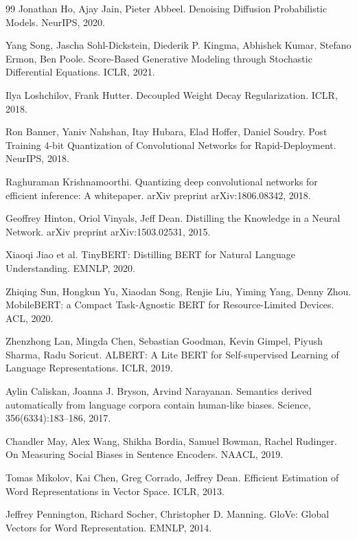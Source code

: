 \documentclass{article}
\begin{document}
\begin{thebibliography}{99}
Jonathan Ho, Ajay Jain, Pieter Abbeel. Denoising Diffusion Probabilistic Models. NeurIPS, 2020.

Yang Song, Jascha Sohl-Dickstein, Diederik P. Kingma, Abhishek Kumar, Stefano Ermon, Ben Poole. Score-Based Generative Modeling through Stochastic Differential Equations. ICLR, 2021.

Ilya Loshchilov, Frank Hutter. Decoupled Weight Decay Regularization. ICLR, 2018.

Ron Banner, Yaniv Nahshan, Itay Hubara, Elad Hoffer, Daniel Soudry. Post Training 4-bit Quantization of Convolutional Networks for Rapid-Deployment. NeurIPS, 2018.

Raghuraman Krishnamoorthi. Quantizing deep convolutional networks for efficient inference: A whitepaper. arXiv preprint arXiv:1806.08342, 2018.

Geoffrey Hinton, Oriol Vinyals, Jeff Dean. Distilling the Knowledge in a Neural Network. arXiv preprint arXiv:1503.02531, 2015.

Xiaoqi Jiao et al. TinyBERT: Distilling BERT for Natural Language Understanding. EMNLP, 2020.

Zhiqing Sun, Hongkun Yu, Xiaodan Song, Renjie Liu, Yiming Yang, Denny Zhou. MobileBERT: a Compact Task-Agnostic BERT for Resource-Limited Devices. ACL, 2020.

Zhenzhong Lan, Mingda Chen, Sebastian Goodman, Kevin Gimpel, Piyush Sharma, Radu Soricut. ALBERT: A Lite BERT for Self-supervised Learning of Language Representations. ICLR, 2019.

Aylin Caliskan, Joanna J. Bryson, Arvind Narayanan. Semantics derived automatically from language corpora contain human-like biases. Science, 356(6334):183--186, 2017.

Chandler May, Alex Wang, Shikha Bordia, Samuel Bowman, Rachel Rudinger. On Measuring Social Biases in Sentence Encoders. NAACL, 2019.

Tomas Mikolov, Kai Chen, Greg Corrado, Jeffrey Dean. Efficient Estimation of Word Representations in Vector Space. ICLR, 2013.

Jeffrey Pennington, Richard Socher, Christopher D. Manning. GloVe: Global Vectors for Word Representation. EMNLP, 2014.

\end{thebibliography}
\end{document}
